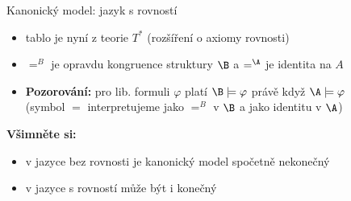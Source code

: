 \documentclass{beamer}
\begin{document}
\begin{frame}{Kanonický model: jazyk s rovností}

    \pause

    \medskip

    \pause
    \begin{itemize}
        \item tablo je nyní z teorie $T^*$ (rozšíření o axiomy rovnosti)\pause
        \item $=^B$ je opravdu kongruence struktury $\B$ a $=^\A$ je identita na $A$\pause
        \item \textbf{Pozorování:} pro lib. formuli $\varphi$ platí \alert{$\B\models\varphi$ právě když $\A\models\varphi$}\\
        (symbol $=$ interpretujeme jako $=^B$ v $\B$ a jako identitu v $\A$)\pause
    \end{itemize}

    \textbf{Všimněte si:}\pause
    \begin{itemize}
        \item v jazyce bez rovnosti je kanonický model spočetně nekonečný\pause
        \item v jazyce s rovností může být i konečný
    \end{itemize}

\end{frame}
\end{document}
